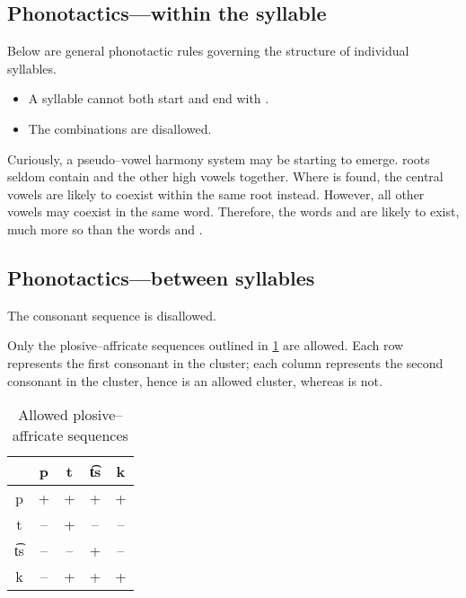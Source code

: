 \subsection{Phonotactics---within the syllable}
Below are general phonotactic rules governing the structure of individual \langname{} syllables.
\begin{itemize}
  \item A syllable cannot both start and end with .
  \item The combinations  are disallowed.
\end{itemize}

Curiously, a pseudo--vowel harmony system may be starting to emerge.
\langname{} roots seldom contain 
and the other high vowels  together. Where  is found,
the central vowels  are likely to coexist within the same root instead.
However, all other vowels may coexist in the same word. Therefore, the words
 and  are likely to exist, much more so than
the words  and .

\subsection{Phonotactics---between syllables}
The consonant sequence  is disallowed.

Only the plosive--affricate sequences outlined in \cref{tab:stop_affricate} are allowed.
Each row represents the first consonant in the cluster; each column represents the second consonant in the cluster, hence
 is an allowed cluster, whereas  is not.
\begin{table}[htbp]
  \centering
  \begin{tabular}{c c c c c}
    \toprule
    & p & t & t͡s & k \\
    \midrule
    p & + & + & + & + \\
    t & -- & + & -- & -- \\
    t͡s & -- & -- & + & -- \\
    k & -- & + & + & + \\
    \bottomrule
  \end{tabular}
  \caption{Allowed plosive--affricate sequences}
  \label{tab:stop_affricate}
\end{table}

